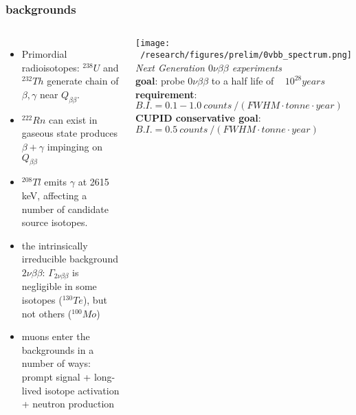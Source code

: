 \documentclass{beamer}
\begin{document}
	\begin{frame}
		\frametitle{backgrounds}
		\begin{columns}[c] %
			
			\begin{itemize}
			\item Primordial radioisotopes: $^{238}U$ and $^{232}Th$ generate chain of $\beta , \gamma$ near $Q_{\beta\beta}$.
			\item $^{222}Rn$ can exist in gaseous state produces $\beta + \gamma$ impinging on $Q_{\beta\beta}$
			\item $^{208}Tl$ emits $\gamma$ at 2615 keV, affecting a number of candidate source isotopes.
			\item the intrinsically irreducible background $2\nu\beta\beta$: $\Gamma_{2\nu\beta\beta}$ is negligible in some isotopes ($^{130}Te$), but not others ($^{100}Mo$)
			\item muons enter the backgrounds in a number of ways: prompt signal + long-lived isotope activation + neutron production
			\end{itemize}			 
			
		
			\texttt{[image: ~/research/figures/prelim/0vbb\_spectrum.png]}
			{\footnotesize \textit{Next Generation $0\nu\beta\beta$ experiments} \\
			\textbf{goal}: probe $0\nu\beta\beta$ to a half life of ~ $10^{28} years$ \\
			\textbf{requirement}: $B.I. = 0.1-1.0 \ counts\ / \left( FWHM\cdot tonne \cdot year \right)$ \\
			\textbf{CUPID conservative goal}: $B.I. = 0.5 \ counts\ / \left( FWHM\cdot tonne \cdot year \right)$}
			
		\end{columns}
	\end{frame}
	
\end{document}
